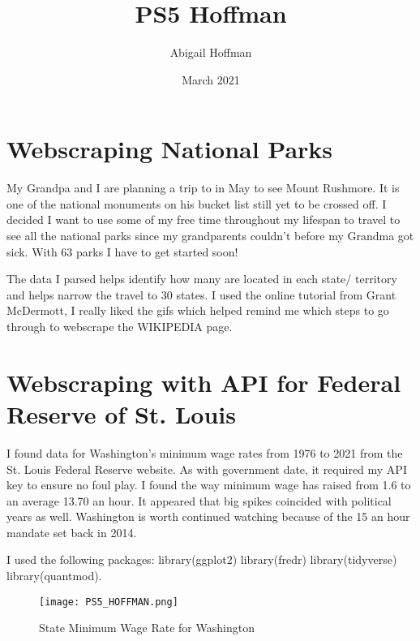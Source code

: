\documentclass{article}
\title{PS5 Hoffman}
\author{Abigail Hoffman }
\date{March 2021}
\begin{document}
\maketitle

\section{Webscraping National Parks}

My Grandpa and I are planning a trip to in May to see Mount Rushmore. It is one of the national monuments on his bucket list still yet to be crossed off. I decided I want to use some of my free time throughout my lifespan to travel to see all the national parks since my grandparents couldn't before my Grandma got sick. With 63 parks I have to get started soon!

The data I parsed helps identify how many are located in each state/ territory and helps narrow the travel to 30 states. I used the online tutorial from Grant McDermott, I really liked the gifs which helped remind me which steps to go through to webscrape the WIKIPEDIA page. 

\section{Webscraping with API for Federal Reserve of St. Louis}

I found data for Washington's minimum wage rates from 1976 to 2021 from the St. Louis Federal Reserve website. As with government date, it required my API key to ensure no foul play. I found the way minimum wage has raised from 1.6 to an average 13.70 an hour. It appeared that big spikes coincided with political years as well. Washington is worth continued watching because of the 15 an hour mandate set back in 2014.

I used the following packages: 
library(ggplot2)
library(fredr)
library(tidyverse)
library(quantmod).
\begin{figure}[h!]
\centering
\texttt{[image: PS5\_HOFFMAN.png]}
\caption{State Minimum Wage Rate for Washington}
\label{fig:PS5_HOFFMAN}
\end{figure}
\end{document}
